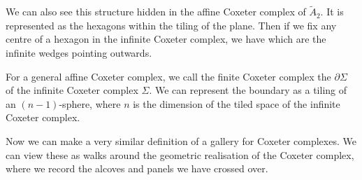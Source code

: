 \documentclass[11pt]{article}
\begin{document}
We can also see this structure hidden in the affine Coxeter complex of $\tilde{A}_2$. It is represented as the hexagons within the tiling of the plane. Then if we fix any centre of a hexagon in the infinite Coxeter complex, we have  which are the infinite wedges pointing outwards. 

For a general affine Coxeter complex, we call the finite Coxeter complex the  $\partial\Sigma$ of the infinite Coxeter complex $\Sigma$. We can represent the boundary as a tiling of an $(n-1)$-sphere, where $n$ is the dimension of the tiled space of the infinite Coxeter complex. 











Now we can make a very similar definition of a gallery for Coxeter complexes. We can view these as walks around the geometric realisation of the Coxeter complex, where we record the alcoves and panels we have crossed over. 
\end{document}
